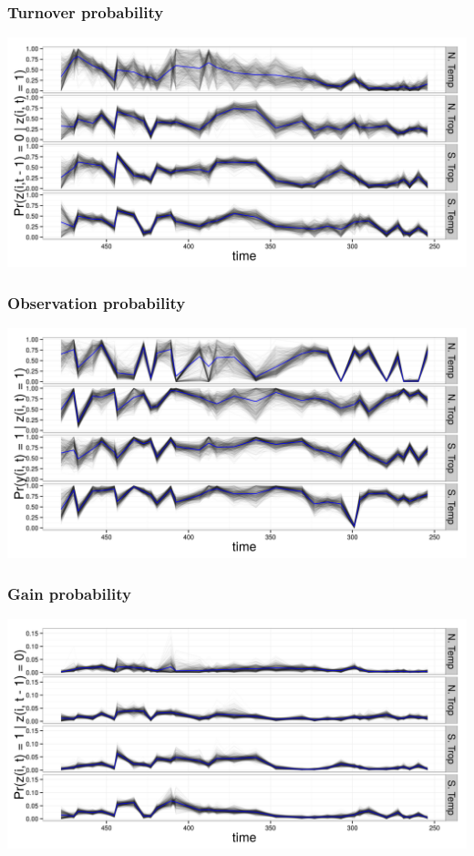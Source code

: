 \documentclass{beamer}
\begin{document}
\begin{frame}
  \frametitle{Turnover probability}
  \begin{center}
    \includegraphics[width=\textwidth,height=0.8\textheight,keepaspectratio=true]{figure/turnover}
  \end{center}
\end{frame}

\begin{frame}
  \frametitle{Observation probability}
  \begin{center}
    \includegraphics[width=\textwidth,height=0.8\textheight,keepaspectratio=true]{figure/observation}
  \end{center}
\end{frame}
\begin{frame}
  \frametitle{Gain probability}
  \begin{center}
    \includegraphics[width=\textwidth,height=0.8\textheight,keepaspectratio=true]{figure/entrance}
  \end{center}
\end{frame}
\end{document}

